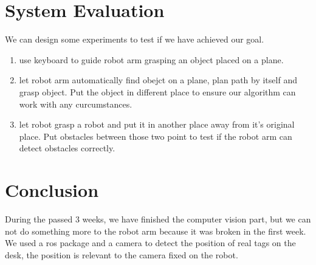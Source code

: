\documentclass[10pt,twocolumn,letterpaper]{article}
\begin{document}
\section{System	Evaluation}

We can design some experiments to test if we have achieved our goal.

\begin{enumerate}
\item use keyboard to guide robot arm grasping an object placed on a plane.
\item let robot arm automatically find obejct on a plane, plan path by itself and grasp object. Put the object in different place to ensure our algorithm can work with any curcumstances.
\item let robot grasp a robot and put it in another place away from it's original place. Put obstacles between those two point to test if the robot arm can detect obstacles correctly.
\end{enumerate}


\section{Conclusion}

During the passed 3 weeks, we have finished the computer vision part, but we can not do something more to the robot arm because it was broken in the first week.  We used a ros package and a camera to detect the position of real tags on the desk, the position is relevant to the camera fixed on the robot.




\end{document}
